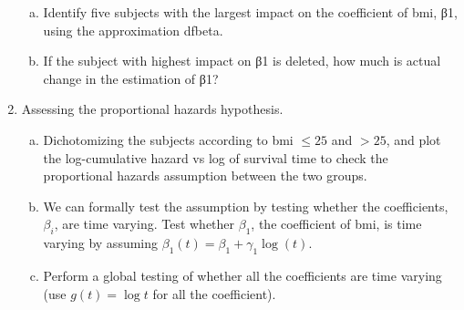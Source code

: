 \documentclass{elegantbook}
\begin{document}
\begin{exercise*}[1]
\begin{enumerate}
\begin{enumerate}[(a)]
            \item Identify five subjects with the largest impact on the coefficient of bmi, β1, using the approximation dfbeta.
            \item If the subject with highest impact on β1 is deleted, how much is actual change in the estimation of β1? 
        \end{enumerate}
        \item Assessing the proportional hazards hypothesis. 
        \begin{enumerate}[(a)]
            \item Dichotomizing the subjects according to bmi $\leq25$ and $> 25$, and plot the log-cumulative hazard vs log of survival time to check the  proportional hazards assumption between the two groups. 
            \item We can formally test the assumption by testing whether the coefficients, $\beta_i$, are time varying. Test whether $\beta_1$, the coefficient of bmi, is time varying by assuming $\beta_1(t)=\beta_1+\gamma_1\log(t)$. 
            \item Perform a global testing of whether all the coefficients are time varying (use $g(t)=\log t$ for all the coefficient).
        \end{enumerate}
    \end{enumerate}
\end{exercise*}
\end{document}
